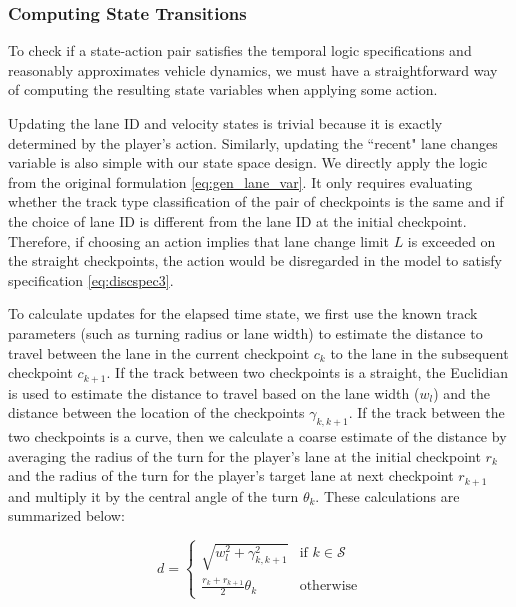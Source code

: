 \subsubsection{Computing State Transitions}
To check if a state-action pair satisfies the temporal logic specifications and reasonably approximates vehicle dynamics, we must have a straightforward way of computing the resulting state variables when applying some action. 

Updating the lane ID and velocity states is trivial because it is exactly determined by the player's action. Similarly, updating the ``recent" lane changes variable is also simple with our state space design. We directly apply the logic from the original formulation \eqref{eq:gen_lane_var}. It only requires evaluating whether the track type classification of the pair of checkpoints is the same and if the choice of lane ID is different from the lane ID at the initial checkpoint. Therefore, if choosing an action implies that lane change limit $L$ is exceeded on the straight checkpoints, the action would be disregarded in the model to satisfy specification \eqref{eq:discspec3}. 

To calculate updates for the elapsed time state, we first use the known track parameters (such as turning radius or lane width) to estimate the distance to travel between the lane in the current checkpoint $c_k$ to the lane in the subsequent checkpoint $c_{k+1}$. If the track between two checkpoints is a straight, the Euclidian is used to estimate the distance to travel based on the lane width ($w_l$) and the distance between the location of the checkpoints $\gamma_{k, k+1}$. If the track between the two checkpoints is a curve, then we calculate a coarse estimate of the distance by averaging the radius of the turn for the player's lane at the initial checkpoint $r_k$ and the radius of the turn for the player's target lane at next checkpoint $r_{k+1}$ and multiply it by the central angle of the turn $\theta_k$. These calculations are summarized below:

\begin{equation} \label{eq:dist_calc}
    d = \begin{cases}
    \sqrt{w_l^2 + \gamma_{k, k+1}^2} &  \text{if } k \in \mathcal{S} \\
    \frac{r_k + r_{k+1}}{2}\theta_k & \text{otherwise}
    \end{cases}
\end{equation}

